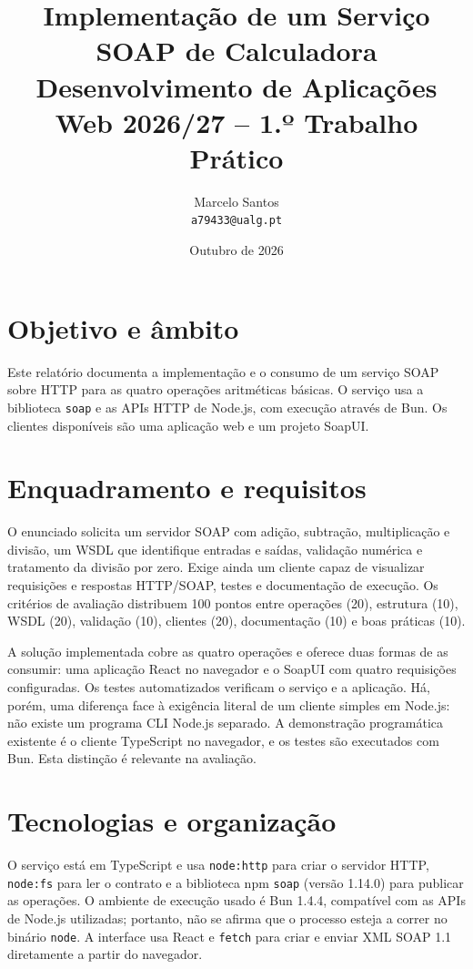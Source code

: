 \documentclass[11pt,a4paper]{article}
\title{Implementação de um Serviço SOAP de Calculadora\\[0.4em]\large Desenvolvimento de Aplicações Web 2026/27 -- 1.º Trabalho Prático}
\author{Marcelo Santos\\\texttt{a79433@ualg.pt}}
\date{Outubro de 2026}
\begin{document}
\maketitle
\tableofcontents
\newpage

\section{Objetivo e âmbito}
Este relatório documenta a implementação e o consumo de um serviço SOAP sobre HTTP para as quatro operações aritméticas básicas. O serviço usa a biblioteca \texttt{soap} e as APIs HTTP de Node.js, com execução através de Bun. Os clientes disponíveis são uma aplicação web e um projeto SoapUI.

\section{Enquadramento e requisitos}
O enunciado solicita um servidor SOAP com adição, subtração, multiplicação e divisão, um WSDL que identifique entradas e saídas, validação numérica e tratamento da divisão por zero. Exige ainda um cliente capaz de visualizar requisições e respostas HTTP/SOAP, testes e documentação de execução. Os critérios de avaliação distribuem 100 pontos entre operações (20), estrutura (10), WSDL (20), validação (10), clientes (20), documentação (10) e boas práticas (10).

A solução implementada cobre as quatro operações e oferece duas formas de as consumir: uma aplicação React no navegador e o SoapUI com quatro requisições configuradas. Os testes automatizados verificam o serviço e a aplicação. Há, porém, uma diferença face à exigência literal de um cliente simples em Node.js: não existe um programa CLI Node.js separado. A demonstração programática existente é o cliente TypeScript no navegador, e os testes são executados com Bun. Esta distinção é relevante na avaliação.

\section{Tecnologias e organização}
O serviço está em TypeScript e usa \texttt{node:http} para criar o servidor HTTP, \texttt{node:fs} para ler o contrato e a biblioteca npm \texttt{soap} (versão 1.14.0) para publicar as operações. O ambiente de execução usado é Bun 1.4.4, compatível com as APIs de Node.js utilizadas; portanto, não se afirma que o processo esteja a correr no binário \texttt{node}. A interface usa React e \texttt{fetch} para criar e enviar XML SOAP 1.1 diretamente a partir do navegador.
\end{document}
